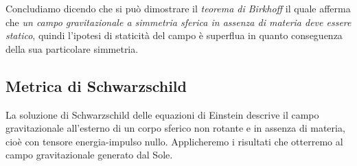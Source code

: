 Concludiamo dicendo che si può dimostrare il 
\emph{teorema di Birkhoff} il quale afferma che
\emph{un campo gravitazionale a simmetria sferica in assenza di materia deve
  essere statico},
quindi l'ipotesi di staticità del campo è superflua in quanto conseguenza della
sua particolare simmetria.

\subsection{Metrica di Schwarzschild}
\label{sec:metrica-schwarzschild}

La soluzione di Schwarzschild delle equazioni di Einstein descrive il campo
gravitazionale all'esterno di un corpo sferico non rotante e in assenza di
materia, cioè con tensore energia-impulso nullo.  Applicheremo i risultati che
otterremo al campo gravitazionale generato dal Sole.

